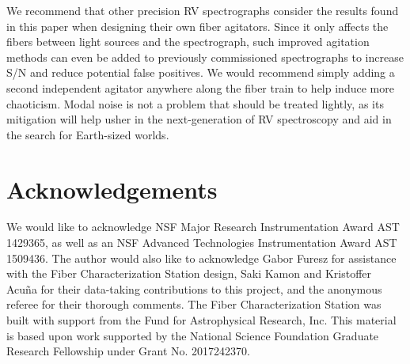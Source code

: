 We recommend that other precision RV spectrographs consider the results found in this paper when designing their own fiber agitators. Since it only affects the fibers between light sources and the spectrograph, such improved agitation methods can even be added to previously commissioned spectrographs to increase S/N and reduce potential false positives. We would recommend simply adding a second independent agitator anywhere along the fiber train to help induce more chaoticism. Modal noise is not a problem that should be treated lightly, as its mitigation will help usher in the next-generation of RV spectroscopy and aid in the search for Earth-sized worlds.

\section*{Acknowledgements}

We would like to acknowledge NSF Major Research Instrumentation Award AST 1429365, as well as an NSF Advanced Technologies Instrumentation Award AST 1509436. The author would also like to acknowledge Gabor Furesz for assistance with the Fiber Characterization Station design, Saki Kamon and Kristoffer Acu\~na for their data-taking contributions to this project, and the anonymous referee for their thorough comments. The Fiber Characterization Station was built with support from the Fund for Astrophysical Research, Inc. This material is based upon work supported by the National Science Foundation Graduate Research Fellowship under Grant No. 2017242370.
